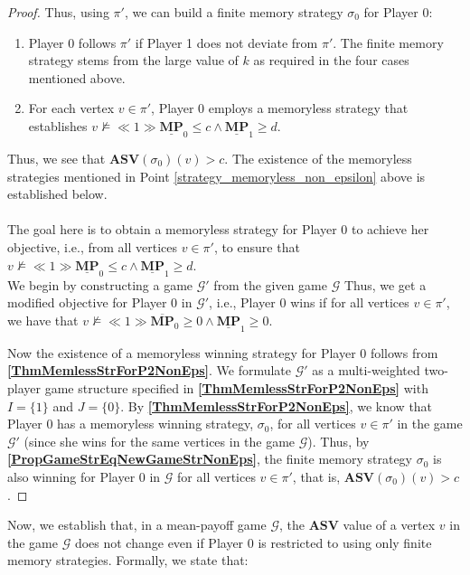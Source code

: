 \begin{proof}
Thus, using $\pi'$, we can build a finite memory strategy $\sigma_0$ for Player 0:
\begin{enumerate}
    \item Player 0 follows $\pi'$ if Player 1 does not deviate from $\pi'$. The finite memory strategy stems from the large value of $k$ as required in the four cases mentioned above.
    \item \label{strategy_memoryless_non_epsilon} For each vertex $v \in \pi'$, Player 0 employs a memoryless strategy that establishes $v \nvDash \ll 1 \gg \underline{\mathbf{MP}}_0 \leqslant c \land \underline{\mathbf{MP}}_1 \geqslant d$.
\end{enumerate}
Thus, we see that $\mathbf{ASV}(\sigma_0)(v) > c$.
The existence of the memoryless strategies mentioned in Point \ref{strategy_memoryless_non_epsilon} above is established below. \\ \\
\noindent The goal here is to obtain a memoryless strategy for Player 0 to achieve her objective, i.e., from all vertices $v \in \pi'$, to ensure that $v \nvDash \ll 1 \gg \underline{\mathbf{MP}}_0 \leqslant c \land \underline{\mathbf{MP}}_1 \geqslant d$. \\
\noindent We begin by constructing a game $\mathcal{G'}$ from the given game $\mathcal{G}$ Thus, we get a modified objective for Player 0 in $\mathcal{G'}$, i.e., Player 0 wins if for all vertices $v \in \pi'$, we have that $v \nvDash \ll 1 \gg \overline{\mathbf{MP}}_0 \geqslant 0 \land \underline{\mathbf{MP}}_1 \geqslant 0$.

Now the existence of a memoryless winning strategy for Player 0 follows from \textbf{\cref{ThmMemlessStrForP2NonEps}}. We formulate $\mathcal{G'}$ as a multi-weighted two-player game structure specified in \textbf{\cref{ThmMemlessStrForP2NonEps}} with $I = \{1\}$ and $J = \{0\}$. By \textbf{\cref{ThmMemlessStrForP2NonEps}}, we know that Player 0 has a memoryless winning strategy, $\sigma_0$,  for all vertices $v \in \pi'$ in the game $\mathcal{G'}$ (since she wins for the same vertices in the game $\mathcal{G}$). Thus, by \textbf{\cref{PropGameStrEqNewGameStrNonEps}}, the finite memory strategy $\sigma_0$ is also winning for Player 0 in $\mathcal{G}$ for all vertices $v \in \pi'$, that is, $\mathbf{ASV}(\sigma_0)(v) > c$.
\end{proof}

Now, we establish that, in a mean-payoff game $\mathcal{G}$, the $\mathbf{ASV}$ value of a vertex $v$ in the game $\mathcal{G}$ does not change even if Player 0 is restricted to using only finite memory strategies. Formally, we state that:

